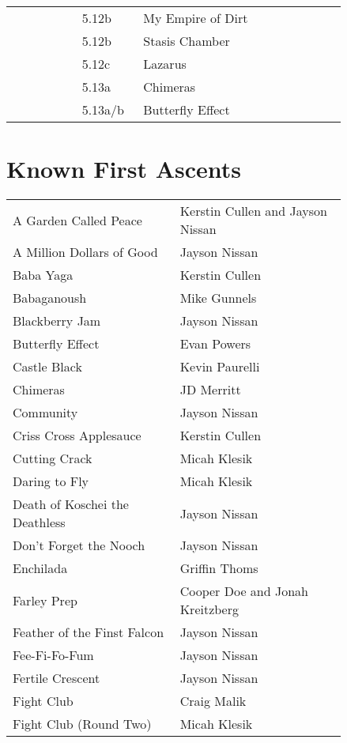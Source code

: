 \begin{flushleft}
\begin{center}
\begin{supertabular}{p{0.18\linewidth}p{0.13\linewidth}p{0.45\linewidth}p{0.08\linewidth}}
&5.12b&My Empire of Dirt & \pageref{rt:My Empire of Dirt} \\
&5.12b&Stasis Chamber & \pageref{rt:Stasis Chamber} \\
&5.12c&Lazarus & \pageref{vr:Lazarus} \\
&5.13a&Chimeras & \pageref{rt:Chimeras} \\
&5.13a/b&Butterfly Effect & \pageref{rt:Butterfly Effect} \\
\end{supertabular}
\end{center}

\needspace{1.5cm}
\section{Known First Ascents}
\begin{center}
\begin{supertabular}{p{0.42\linewidth}p{0.42\linewidth}}
A Garden Called Peace & Kerstin Cullen and Jayson Nissan\\
A Million Dollars of Good & Jayson Nissan\\
Baba Yaga & Kerstin Cullen\\
Babaganoush & Mike Gunnels\\
Blackberry Jam & Jayson Nissan\\
Butterfly Effect & Evan Powers\\
Castle Black & Kevin Paurelli\\
Chimeras & JD Merritt\\
Community & Jayson Nissan\\
Criss Cross Applesauce & Kerstin Cullen\\
Cutting Crack & Micah Klesik\\
Daring to Fly & Micah Klesik\\
Death of Koschei the Deathless & Jayson Nissan\\
Don't Forget the Nooch & Jayson Nissan\\
Enchilada & Griffin Thoms\\
Farley Prep & Cooper Doe and Jonah Kreitzberg\\
Feather of the Finst Falcon & Jayson Nissan\\
Fee-Fi-Fo-Fum & Jayson Nissan\\
Fertile Crescent & Jayson Nissan\\
Fight Club & Craig Malik\\
Fight Club (Round Two) & Micah Klesik\\

\end{supertabular}
\end{center}
\end{flushleft}
